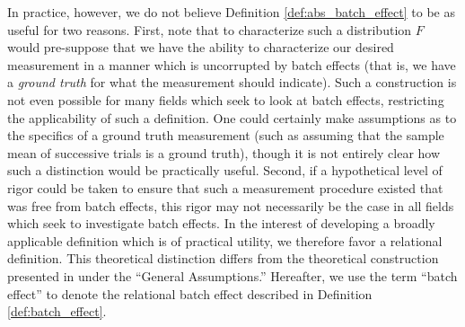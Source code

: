 In practice, however, we do not believe Definition \ref{def:abs_batch_effect} to be as useful for two reasons. First, note that to characterize such a distribution $F$ would pre-suppose that we have the ability to characterize our desired measurement in a manner which is uncorrupted by batch effects (that is, we have a \textit{ground truth} for what the measurement should indicate). Such a construction is not even possible for many fields which seek to look at batch effects, restricting the applicability of such a definition. One could certainly make assumptions as to the specifics of a ground truth measurement (such as assuming that the sample mean of successive trials is a ground truth), though it is not entirely clear how such a distinction would be practically useful. Second, if a hypothetical level of rigor could be taken to ensure that such a measurement procedure existed that was free from batch effects, this rigor may not necessarily be the case in all fields which seek to investigate batch effects. In the interest of developing a broadly applicable definition which is of practical utility, we therefore favor a relational definition. This theoretical distinction differs from the theoretical construction presented in \citet{Lazar2013Jul} under the ``General Assumptions.'' Hereafter, we use the term ``batch effect'' to denote the relational batch effect described in Definition \ref{def:batch_effect}.

